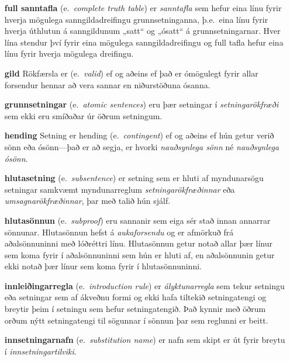 \begin{enumerate}[leftmargin=35pt]
	\item[\textbf{full sanntafla}] (e.\ \emph{complete truth table}) er \emph{sanntafla} sem hefur eina línu fyrir hverja mögulega sanngildadreifingu grunnsetninganna, þ.e.\ eina línu fyrir hverja úthlutun á sanngildunum „satt“ og „ósatt“ á grunnsetningarnar. Hver lína stendur því fyrir eina mögulega sanngildadreifingu og full tafla hefur eina línu fyrir hverja mögulega dreifingu.
		
	\item[\textbf{gild}] Rökfærsla er  (e.\ \emph{valid}) ef og aðeins ef það er ómögulegt fyrir allar forsendur hennar að vera sannar en niðurstöðuna ósanna.
	
	\item[\textbf{grunnsetningar}] (e.\ \emph{atomic sentences}) eru þær setningar í \emph{setningarökfræði} sem ekki eru smíðaðar úr öðrum setningum.
	
	\item[\textbf{hending}] Setning er hending (e.\ \emph{contingent}) ef og aðeins ef hún getur verið sönn eða ósönn---það er að segja, er hvorki \emph{nauðsynlega sönn} né \emph{nauðsynlega ósönn}.
	
	\item[\textbf{hlutasetning}] (e.\ \emph{subsentence}) er setning sem er hluti af myndunarsögu setningar samkvæmt myndunarreglum \emph{setningarökfræðinnar} eða \emph{umsagnarökfræðinnar}, þar með talið hún sjálf.
	
	\item[\textbf{hlutasönnun}] (e.\ \emph{subproof}) eru sannanir sem eiga sér stað innan annarrar sönnunar. Hlutasönnun hefst á \emph{aukaforsendu} og er afmörkuð frá aðalsönnuninni með lóðréttri línu. Hlutasönnun getur notað allar þær línur sem koma fyrir í aðalsönnuninni sem hún er hluti af, en aðalsönnunin getur ekki notað þær línur sem koma fyrir í hlutasönnuninni. 
	
	\item[\textbf{innleiðingarregla}] (e.\ \emph{introduction rule}) er \emph{ályktunarregla} sem tekur setningu eða setningar sem af ákveðnu formi og ekki hafa tiltekið setningatengi og breytir þeim í setningu sem hefur setningatengið. Það kynnir með öðrum orðum nýtt setningatengi til sögunnar í sönnun þar sem reglunni er beitt.
	
	\item[\textbf{innsetningarnafn}] (e.\ \emph{substitution name}) er nafn  sem skipt er út fyrir breytu  í \emph{innsetningartilviki}.
	

\end{enumerate}
